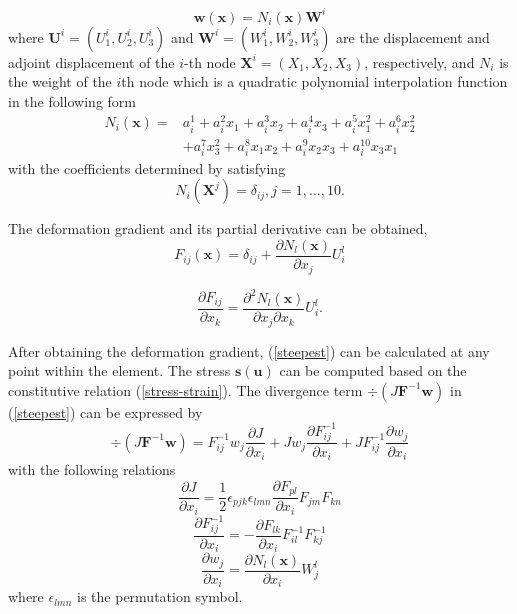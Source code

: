 \documentclass[journal]{IEEEtran}
\renewcommand{\vec}[1]{\mathbf{#1}}
\theoremstyle{definition}
\renewcommand{\vec}[1]{\mathbf{#1}}
\begin{document}
\begin{equation}
  \vec{w}\left(\vec{x}\right) = N_i\left(\vec{x}\right) \vec{W}^i
\end{equation}
where $\vec{U}^i = \left(U^i_1,U^i_2,U^i_3\right)$ and $\vec{W}^i=\left(W^i_1,W^i_2,W^i_3\right)$ are the displacement and adjoint displacement of the $i$-th node $\vec{X}^i=\left(X_1, X_2, X_3\right)$, respectively, and $N_i$ is the weight of the $i$th node which is a quadratic polynomial interpolation function in the following form
\begin{equation}
  \begin{split}
    N_i \left(\vec{x}\right) = &a_i^1 + a_i^2x_1 + a_i^3x_2 + a_i^4x_3 + a_i^5x_1^2 + a_i^6x_2^2 \\
    &+ a_i^7x_3^2 + a_i^8x_1x_2 + a_i^9x_2x_3 + a_i^{10}x_3x_1
  \end{split}
\end{equation}
with the coefficients determined by satisfying
\begin{equation}
  N_i(\vec{X}^j) = \delta_{ij}, j=1,...,10.
\end{equation}

The deformation gradient and its partial derivative can be obtained,
\begin{equation}
  F_{ij} \left(\vec{x}\right) = \delta_{ij} + \frac{\partial N_l\left(\vec{x}\right)}{\partial x_j} U^l_i
\end{equation}

\begin{equation}
  \frac{\partial F_{ij}}{\partial x_k} = \frac{\partial^2 N_l\left(\vec{x}\right)}{\partial x_j\partial x_k} U^l_i.
\end{equation}

After obtaining the deformation gradient, (\ref{steepest}) can be calculated at any point within the element. The stress $\vec{s}(\vec{u})$ can be computed based on the constitutive relation (\ref{stress-strain}). The divergence term $\div{\left(J\mathbf{F}^{-1}\vec{w}\right)}$ in (\ref{steepest}) can be expressed by
\begin{equation}
  \div{\left(J\mathbf{F}^{-1}\vec{w}\right)}  = F^{-1}_{ij}w_j \frac{\partial J}{\partial x_i} + Jw_j \frac{\partial F^{-1}_{ij}}{\partial x_i} + JF^{-1}_{ij} \frac{\partial w_j}{\partial x_i}
\end{equation}
with the following relations
\begin{equation}
  \frac{\partial J}{\partial x_i} = \frac{1}{2}\epsilon_{pjk}\epsilon_{lmn}\frac{\partial F_{pl}}{\partial x_i}F_{jm}F_{kn}
\end{equation}
\begin{equation}
  \frac{\partial F^{-1}_{ij}}{\partial x_i} = -\frac{\partial F_{lk}}{\partial x_i} F^{-1}_{il} F^{-1}_{kj}
\end{equation}
\begin{equation}
  \frac{\partial w_{j}}{\partial x_i} =\frac{\partial N_l\left(\vec{x}\right)}{\partial x_i} W^l_j
\end{equation}
where $\epsilon_{lmn}$ is the permutation symbol.
\end{document}
